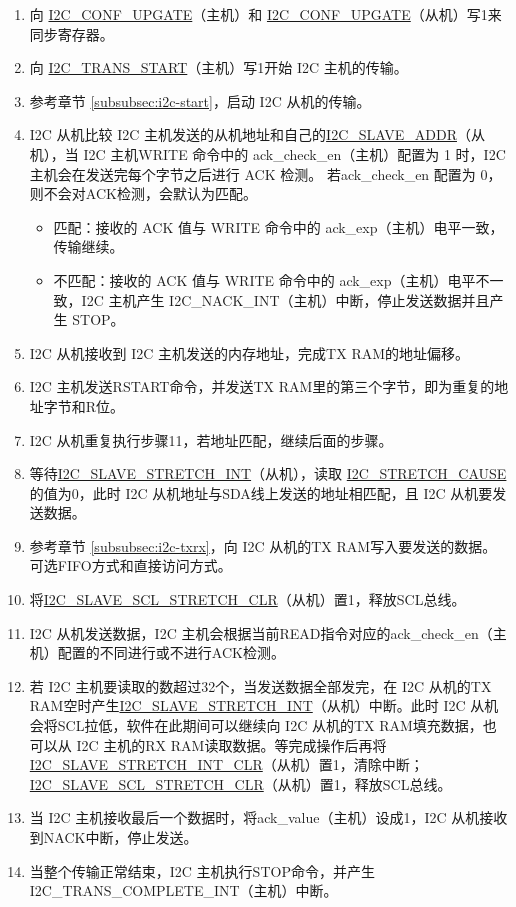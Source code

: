 \documentclass[main\_\_CN.tex]{subfiles}
\begin{document}
\begin{enumerate}
\item 向 \hyperref[fielddesc:I2CCONFUPGATE]{I2C\_CONF\_UPGATE}（主机）和 \hyperref[fielddesc:I2CCONFUPGATE]{I2C\_CONF\_UPGATE}（从机）写1来同步寄存器。
\item 向 \hyperref[fielddesc:I2CTRANSSTART]{I2C\_TRANS\_START}（主机）写1开始 I2C 主机的传输。
\item 参考章节 \ref{subsubsec:i2c-start}，启动 I2C 从机的传输。
\item I2C 从机比较 I2C 主机发送的从机地址和自己的\hyperref[fielddesc:I2CSLAVEADDR]{I2C\_SLAVE\_ADDR}（从机），当 I2C 主机WRITE 命令中的 ack\_check\_en（主机）配置为 1 时，I2C 主机会在发送完每个字节之后进行 ACK 检测。 若ack\_check\_en 配置为 0，则不会对ACK检测，会默认为匹配。
\begin{itemize}
\item 匹配：接收的 ACK 值与 WRITE 命令中的 ack\_exp（主机）电平一致，传输继续。
\item 不匹配：接收的 ACK 值与 WRITE 命令中的 ack\_exp（主机）电平不一致，I2C 主机产生 I2C\_NACK\_INT（主机）中断，停止发送数据并且产生 STOP。
\end{itemize}
\item I2C 从机接收到 I2C 主机发送的内存地址，完成TX RAM的地址偏移。
\item I2C 主机发送RSTART命令，并发送TX RAM里的第三个字节，即为重复的地址字节和R位。
\item I2C 从机重复执行步骤11，若地址匹配，继续后面的步骤。

\item 等待\hyperref[int:i2c-slave-stretch]{I2C\_SLAVE\_STRETCH\_INT}（从机），读取 \hyperref[fielddesc:I2CSTRETCHCAUSE]{I2C\_STRETCH\_CAUSE} 的值为0，此时 I2C 从机地址与SDA线上发送的地址相匹配，且 I2C 从机要发送数据。

\item 参考章节 \ref{subsubsec:i2c-txrx}，向 I2C 从机的TX RAM写入要发送的数据。可选FIFO方式和直接访问方式。
\item 将\hyperref[fielddesc:I2CSLAVESCLSTRETCHCLR]{I2C\_SLAVE\_SCL\_STRETCH\_CLR}（从机）置1，释放SCL总线。


\item I2C 从机发送数据，I2C 主机会根据当前READ指令对应的ack\_check\_en（主机）配置的不同进行或不进行ACK检测。
\item 若 I2C 主机要读取的数超过32个，当发送数据全部发完，在 I2C 从机的TX RAM空时产生\hyperref[int:i2c-slave-stretch]{I2C\_SLAVE\_STRETCH\_INT}（从机）中断。此时 I2C 从机会将SCL拉低，软件在此期间可以继续向 I2C 从机的TX RAM填充数据，也可以从 I2C 主机的RX RAM读取数据。等完成操作后再将\hyperref[fielddesc:I2CSLAVESTRETCHINTCLR]{I2C\_SLAVE\_STRETCH\_INT\_CLR}（从机）置1，清除中断；\hyperref[fielddesc:I2CSLAVESCLSTRETCHCLR]{I2C\_SLAVE\_SCL\_STRETCH\_CLR}（从机）置1，释放SCL总线。

\item 当 I2C 主机接收最后一个数据时，将ack\_value（主机）设成1，I2C 从机接收到NACK中断，停止发送。

\item 当整个传输正常结束，I2C 主机执行STOP命令，并产生 I2C\_TRANS\_COMPLETE\_INT（主机）中断。
\end{enumerate}
\end{document}
